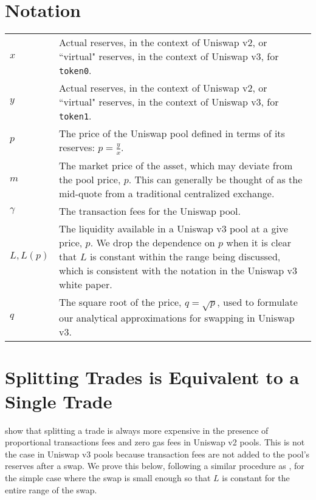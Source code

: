 \documentclass[11pt]{article}
\begin{document}
\begin{appendices}

\newpage

\section{Notation}\label{sec:7}
\begin{center}
    \begin{tabular}{p{1cm}p{15cm}}
     $x$ & Actual reserves, in the context of Uniswap v2, or ``virtual" reserves, in the context of Uniswap v3, for \texttt{token0}. \\
     $y$ & Actual reserves, in the context of Uniswap v2, or ``virtual" reserves, in the context of Uniswap v3, for \texttt{token1}. \\
     $p$ & The price of the Uniswap pool defined in terms of its reserves: $p = \frac{y}{x}$. \\
     $m$ & The market price of the asset, which may deviate from the pool price, $p$. This can generally be thought of as the mid-quote from a traditional centralized exchange. \\
     $\gamma$ & The transaction fees for the Uniswap pool. \\
     $L, L(p)$ & The liquidity available in a Uniswap v3 pool at a give price, $p$. We drop the dependence on $p$ when it is clear that $L$ is constant within the range being discussed, which is consistent with the notation in the Uniswap v3 white paper. \\
     $q$ & The square root of the price, $q = \sqrt{p}$, used to formulate our analytical approximations for swapping in Uniswap v3.
    \end{tabular}
\end{center}

\section{Splitting Trades is Equivalent to a Single Trade}\label{sec:8}

\citet{angeris2021analysis} show that splitting a trade is always more expensive in the presence of proportional transactions fees and zero gas fees in Uniswap v2 pools. This is not the case in Uniswap v3 pools because transaction fees are not added to the pool's reserves after a swap. We prove this below, following a similar procedure as \citet{angeris2021analysis}, for the simple case where the swap is small enough so that $L$ is constant for the entire range of the swap.


\end{appendices}
\end{document}
